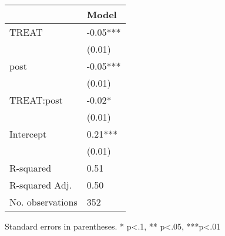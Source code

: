 \begin{table}
\caption{}
\label{}
\begin{center}
\begin{tabular}{ll}
\hline
                 & Model     \\
\hline
TREAT            & -0.05***  \\
                 & (0.01)    \\
post             & -0.05***  \\
                 & (0.01)    \\
TREAT:post       & -0.02*    \\
                 & (0.01)    \\
Intercept        & 0.21***   \\
                 & (0.01)    \\
R-squared        & 0.51      \\
R-squared Adj.   & 0.50      \\
No. observations & 352       \\
\hline
\end{tabular}
Standard errors in parentheses. \newline 
* p<.1, ** p<.05, ***p<.01
\end{center}
\end{table}
